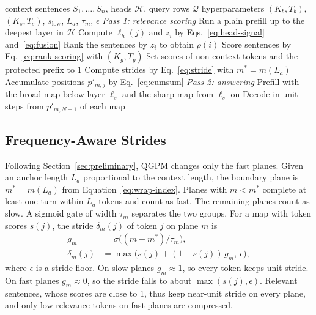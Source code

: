 \documentclass[11pt]{article}
\begin{document}
\begin{algorithm}[t]
\caption{QGPM inference}
\label{alg:qgpm}
\begin{algorithmic}[1]
\Require context sentences $S_1, \ldots, S_n$, heads $\mathcal{H}$, query rows $\mathcal{Q}$
\Require hyperparameters $(K_b, T_b)$, $(K_s, T_s)$, $s_{\mathrm{low}}$, $L_a$, $\tau_m$, $\epsilon$
\Statex \textit{Pass 1: relevance scoring}
\State Run a plain prefill up to the deepest layer in $\mathcal{H}$
\State Compute $\ell_h(j)$ and $z_i$ by Eqs.~\ref{eq:head-signal} and~\ref{eq:fusion}
\State Rank the sentences by $z_i$ to obtain $\rho(i)$
    \State Score sentences by Eq.~\ref{eq:rank-scoring} with $(K_g, T_g)$
    \State Set scores of non-context tokens and the protected prefix to 1
    \State Compute strides by Eq.~\ref{eq:stride} with $m^* = m(L_a)$
    \State Accumulate positions $p'_{m,j}$ by Eq.~\ref{eq:cumsum}
\EndFor
\Statex \textit{Pass 2: answering}
\State Prefill with the broad map below layer $\ell_s$ and the sharp map from $\ell_s$ on
\State Decode in unit steps from $p'_{m,N-1}$ of each map
\end{algorithmic}
\end{algorithm}

\subsection{Frequency-Aware Strides}
\label{sec:method-stride}

Following Section~\ref{sec:preliminary}, QGPM changes only the fast planes. Given an anchor length $L_a$ proportional to the context length, the boundary plane is $m^* = m(L_a)$ from Equation~\ref{eq:wrap-index}. Planes with $m < m^*$ complete at least one turn within $L_a$ tokens and count as fast. The remaining planes count as slow. A sigmoid gate of width $\tau_m$ separates the two groups. For a map with token scores $s(j)$, the stride $\delta_m(j)$ of token $j$ on plane $m$ is
\begin{equation}
\begin{aligned}
g_m &= \sigma\big((m - m^*) / \tau_m\big), \\
\delta_m(j) &= \max\big(s(j) + (1 - s(j))\, g_m,\ \epsilon\big),
\end{aligned}
\label{eq:stride}
\end{equation}
where $\epsilon$ is a stride floor. On slow planes $g_m \approx 1$, so every token keeps unit stride. On fast planes $g_m \approx 0$, so the stride falls to about $\max(s(j), \epsilon)$. Relevant sentences, whose scores are close to 1, thus keep near-unit stride on every plane, and only low-relevance tokens on fast planes are compressed.
\end{document}

